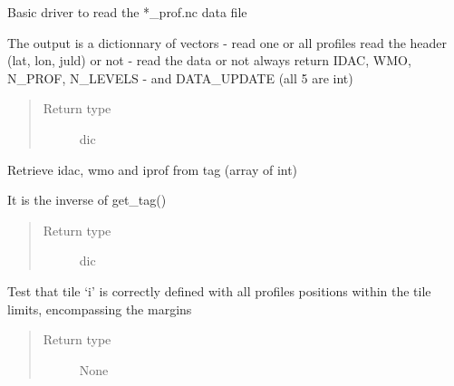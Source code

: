 \documentclass[letterpaper,10pt,english]{sphinxmanual}
\begin{document}

\begin{fulllineitems}
\label{\detokenize{pargopy:pargopy.argotools.read_profile}}
Basic driver to read the *\_prof.nc data file

The output is a dictionnary of vectors
- read one or all profiles read the header (lat, lon, juld) or not
- read the data or not always return IDAC, WMO, N\_PROF, N\_LEVELS
- and DATA\_UPDATE (all 5 are int)
\begin{quote}\begin{description}
\item[{Return type}] \leavevmode
dic

\end{description}\end{quote}

\end{fulllineitems}


\begin{fulllineitems}
\label{\detokenize{pargopy:pargopy.argotools.retrieve_infos_from_tag}}
Retrieve idac, wmo and iprof from tag (array of int)

It is the inverse of get\_tag()
\begin{quote}\begin{description}
\item[{Return type}] \leavevmode
dic

\end{description}\end{quote}

\end{fulllineitems}


\begin{fulllineitems}
\label{\detokenize{pargopy:pargopy.argotools.test_tiles}}
Test that tile ‘i’ is correctly defined with all profiles positions
within the tile limits, encompassing the margins
\begin{quote}\begin{description}
\item[{Return type}] \leavevmode
None

\end{description}\end{quote}

\end{fulllineitems}
\end{document}
